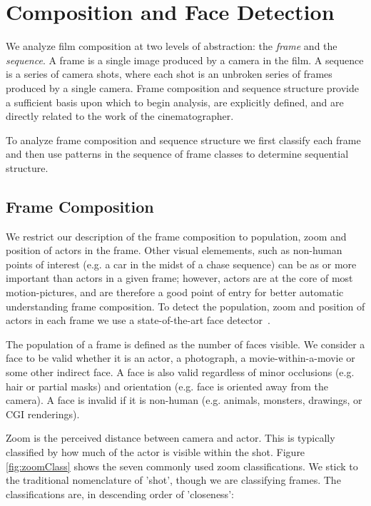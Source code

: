 \section*{Composition and Face Detection}

We analyze film composition at two levels of abstraction: the \emph{frame} and the \emph{sequence}.  A frame is a single image produced by a camera in the film.  A sequence is a series of camera shots, where each shot is an unbroken series of frames produced by a single camera.  Frame composition and sequence structure provide a sufficient basis upon which to begin analysis, are explicitly defined, and are directly related to the work of the cinematographer.

To analyze frame composition and sequence structure we first classify each frame and then use patterns in the sequence of frame classes to determine sequential structure.

\subsection*{Frame Composition}

We restrict our description of the frame composition to population, zoom and position of actors in the frame. Other visual elemements, such as non-human points of interest (e.g. a car in the midst of a chase sequence) can be as or more important than actors in a given frame; however, actors are at the core of most motion-pictures, and are therefore a good point of entry for better automatic understanding frame composition. To detect the population, zoom and position of actors in each frame we use a state-of-the-art face detector~\cite{mathias_face_2014}.

The population of a frame is defined as the number of faces visible. We consider a face to be valid whether it is an actor, a photograph, a movie-within-a-movie or some other indirect face. A face is also valid regardless of minor occlusions (e.g. hair or partial masks) and orientation (e.g. face is oriented away from the camera). A face is invalid if it is non-human (e.g. animals, monsters, drawings, or CGI renderings). 

Zoom is the perceived distance between camera and actor. This is typically classified by how much of the actor is visible within the shot. Figure \ref{fig:zoomClass} shows the seven commonly used zoom classifications. We stick to the traditional nomenclature of 'shot', though we are classifying frames. The classifications  are, in descending order of 'closeness':


